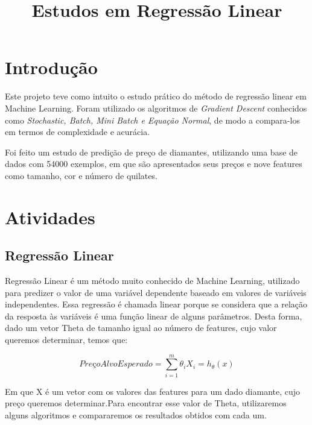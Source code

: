 \documentclass[conference]{IEEEtran}
\begin{document}
\title{Estudos em Regressão Linear}

\author{
\and
{}
}

\maketitle

\section{Introdução}

Este projeto teve como intuito o estudo prático do método de regressão linear em Machine Learning. Foram utilizado os algoritmos de \textit{Gradient Descent} conhecidos como \textit{Stochastic, Batch, Mini Batch e Equação Normal}, de modo a compara-los em termos de complexidade e acurácia.~\cite{sandra}

Foi feito um estudo de predição de preço de diamantes, utilizando uma base de dados com 54000 exemplos, em que são apresentados seus preços e nove features como tamanho, cor e número de quilates.

\section{Atividades}

\subsection{Regressão Linear}

Regressão Linear é um método muito conhecido de Machine Learning, utilizado para predizer o valor de uma variável dependente baseado em valores de variáveis independentes. Essa regressão é chamada linear porque se considera que a relação da resposta às variáveis é uma função linear de alguns parâmetros. Desta forma, dado um vetor Theta de tamanho igual ao número de features, cujo valor queremos determinar, temos que:

\begin{equation} \label{eq:hx}
PreçoAlvoEsperado = \sum_{i=1}^{m} \theta_{i}X_{i} = h_{\theta}(x)
\end{equation}

Em que X é um vetor com os valores das features para um dado diamante, cujo preço queremos determinar.Para encontrar esse valor de Theta, utilizaremos alguns algoritmos e compararemos os resultados obtidos com cada um.
\end{document}
